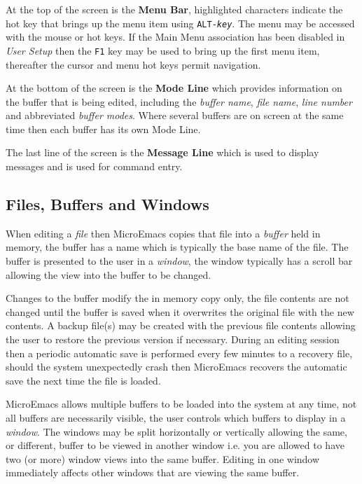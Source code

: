 \documentclass[11pt,a4paper,pdftex]{article}
\begin{document}
  At the top of the screen is the \textbf{Menu Bar}, highlighted characters
  indicate the hot key that brings up the menu item using
  \texttt{ALT-\textit{key}}. The menu may be accessed with the mouse or hot
  keys. If the Main Menu association has been disabled in \textit{User Setup}
  then the \texttt{F1} key may be used to bring up the first menu item,
  thereafter the cursor and menu hot keys permit navigation.

  At the bottom of the screen is the \textbf{Mode Line} which provides
  information on the buffer that is being edited, including the \textit{buffer
  name}, \textit{file name}, \textit{line number} and abbreviated
  \textit{buffer modes}. Where several buffers are on screen at the same time
  then each buffer has its own Mode Line.

  The last line of the screen is the \textbf{Message Line} which is used to
  display messages and is used for command entry.

\subsection{Files, Buffers and Windows}

  When editing a \textit{file} then MicroEmacs copies that file into a
  \textit{buffer} held in memory, the buffer has a name which is typically the
  base name of the file. The buffer is presented to the user in a
  \textit{window}, the window typically has a scroll bar allowing the view
  into the buffer to be changed.

  Changes to the buffer modify the in memory copy only, the file contents are
  not changed until the buffer is saved when it overwrites the original file
  with the new contents. A backup file(s) may be created with the previous
  file contents allowing the user to restore the previous version if
  necessary. During an editing session then a periodic automatic save is
  performed every few minutes to a recovery file, should the system
  unexpectedly crash then MicroEmacs recovers the automatic save the next time
  the file is loaded.

  MicroEmacs allows multiple buffers to be loaded into the system at any time,
  not all buffers are necessarily visible, the user controls which buffers to
  display in a \textit{window}. The windows may be split horizontally or
  vertically allowing the same, or different, buffer to be viewed in another
  window i.e. you are allowed to have two (or more) window views into the same
  buffer. Editing in one window immediately affects other windows that are
  viewing the same buffer.
\end{document}
